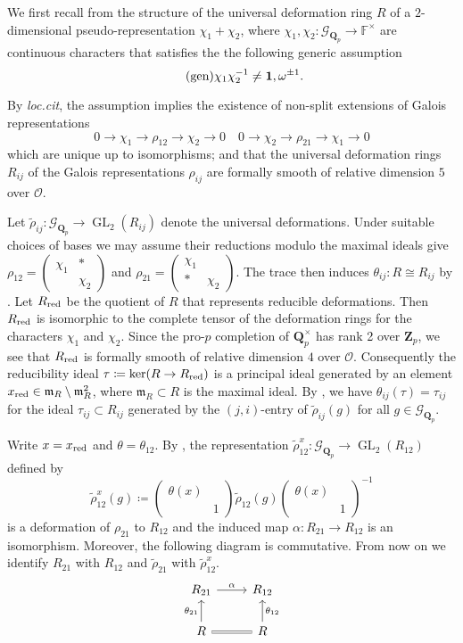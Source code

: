 \documentclass[leqno]{amsart}
\theoremstyle{definition}
\theoremstyle{remark}
\newcommand{\smat}[1]{\left(\begin{smallmatrix} #1 \end{smallmatrix}\right)}
\newcommand{\id}{\mathbf{1}}
\newcommand{\oo}{\mathcal{O}}
\newcommand{\fF}{\mathbb{F}} %
\newcommand{\Qp}{\mathbf{Q}_p}
\newcommand{\Zp}{\mathbf{Z}_p}
\DeclareMathOperator{\GL}{GL}
\newcommand{\fm}{\mathfrak{m}}
\newcommand{\Gp}{\mathcal{G}_{\Qp}} %
\newcommand{\red}{\textnormal{red}}
\newcommand{\xx}{x_\textnormal{red}}
\begin{document}
We first recall from \cite[\S B.1]{pask}
the structure of the universal deformation ring 
$R$ of a $2$-dimensional pseudo-representation 
$\chi_1+\chi_2$,
where $\chi_1,\chi_2\colon \Gp\to \fF^\times$ 
are continuous characters that satisfies the 
the following generic assumption
\begin{equation}\label{cond:generic}\tag{\text{gen}}
	\chi_1\chi_2^{-1}\neq \id,\omega^{\pm1}.
\end{equation}

By \textit{loc.cit}, the assumption
implies the existence of non-split extensions
of Galois representations
\begin{equation*}
    0\to \chi_1\to \rho_{12}\to \chi_2\to 0\quad
    0\to \chi_2\to \rho_{21}\to \chi_1\to 0
\end{equation*}
which are unique up to isomorphisms;
and that the universal deformation rings
$R_{ij}$ of the Galois representations $\rho_{ij}$
are formally smooth of relative dimension $5$ over $\oo$.


Let $\tilde{\rho}_{ij}\colon \Gp\to\GL_2(R_{ij})$
denote the universal deformations.
Under suitable choices of bases we may assume
their reductions modulo the maximal ideals give
$\rho_{12}=\smat{\chi_1&*\\&\chi_2}$ and
$\rho_{21}=\smat{\chi_1&\\*&\chi_2}$.
The trace then induces 
$\theta_{ij}\colon R\cong R_{ij}$
by \cite[Prop B.17]{pask}.
Let $R_{\red}$ be the quotient of $R$
that represents reducible deformations.
Then $R_{\red}$ is isomorphic
to the complete tensor of the
deformation rings for the characters $\chi_1$ and $\chi_2$.
Since the pro-$p$ completion of $\Qp^\times$
has rank 2 over $\Zp$,
we see that $R_{\red}$ is formally smooth of
relative dimension $4$ over $\oo$.
Consequently the reducibility ideal 
$\tau\coloneqq \ker(R\to R_{\red})$ 
is a principal ideal generated by 
an element $\xx\in\fm_R\setminus \fm_R^2$,
where $\fm_R\subset R$ is the maximal ideal.
By \cite[Prop B.23]{pask},
we have $\theta_{ij}(\tau)=\tau_{ij}$
for the ideal $\tau_{ij}\subset R_{ij}$
generated by the $(j,i)$-entry of $ \tilde{\rho}_{ij}(g)$
for all $g\in \Gp$.

Write $x=\xx$ and $\theta=\theta_{12}$.
By \cite[Prop B.24]{pask},
the representation 
$\tilde{\rho}_{12}^x\colon \Gp\to \GL_2(R_{12})$
defined by
\begin{equation*}
	\tilde{\rho}_{12}^x(g)\coloneqq 
	\smat{\theta(x)&\\&1}
	\tilde{\rho}_{12}(g)
	\smat{\theta(x)&\\&1}^{-1}
\end{equation*}
is a deformation of $\rho_{21}$ to $R_{12}$
and the induced map
$\alpha\colon R_{21}\to R_{12}$ is an isomorphism.
Moreover, the following diagram is commutative.
From now on we identify 
$R_{21}$ with $R_{12}$ and
$\tilde{\rho}_{21}$ with 
$\tilde{\rho}_{12}^x$.
\begin{equation*}
	\begin{tikzcd}
		R_{21} \arrow[r,"\alpha"] &
		R_{12}\\
		R\arrow[u,"\theta_{21}"] \arrow[r,equal] &
		R\arrow[u,"\theta_{12}",swap]
	\end{tikzcd}
\end{equation*}
\end{document}
